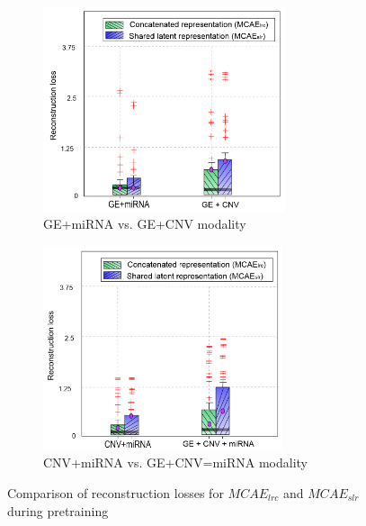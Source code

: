 \begin{figure}
	\centering
	\begin{subfigure}{.48\linewidth}
		\centering
		\includegraphics[width=\linewidth,height=60mm]{images/ce_mcae_1.png}
		\caption{GE+miRNA vs. GE+CNV modality}
        \label{fig:ce_ge_mirna}
	\end{subfigure}
	\begin{subfigure}{0.48\linewidth}
		\centering
		\includegraphics[width=\linewidth,height=60mm]{images/ce_mcae_2.png}
		\caption{CNV+miRNA vs. GE+CNV=miRNA modality}
        \label{fig:ce_ge_cnv}
	\end{subfigure}
	\caption{Comparison of reconstruction losses for $MCAE_{lrc}$ and $MCAE_{slr}$ during pretraining} 
	\label{fig:ce_multimodal_models_1}
\end{figure}

